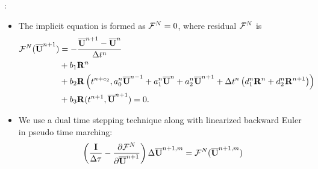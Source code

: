 \documentclass[aspectratio=169,serif]{beamer} %
\begin{document}
\begin{frame}{\secname: \subsecname}
  \begin{itemize}
    \item The implicit equation is formed as $\mathcal{F}^N=0$, where residual $\mathcal{F}^N$ is
          \small
          \begin{equation}
            \begin{aligned}
              \mathcal{F}^N(\overline{\mathbf{U}}^{n+1}) & = -\frac{\overline{\mathbf{U}}^{n+1} - \overline{\mathbf{U}}^{n}}{{\Delta} t^n} \\
                               & +
              b_1 \mathbf{R}^n                                                   \\
                               & +
              b_2 \mathbf{R}\left(t^{n+c_2},a^n_0\overline{\mathbf{U}}^{n - 1} +
              a^n_1\overline{\mathbf{U}}^{n} +
              a^n_2\overline{\mathbf{U}}^{n + 1}
              +
              {\Delta} t^n
              \left(
              d^n_1\mathbf{R}^{n} +
              d^n_2\mathbf{R}^{n + 1}
              \right)\right)                                             \\
                               & +
              b_3 \mathbf{R}(t^{n+1},\overline{\mathbf{U}}^{n+1}) = 0.
              \label{eq:nestedDITR_F}
            \end{aligned}
          \end{equation}
          \normalsize
    \item We use a dual time stepping technique \cite{jameson1991time} along
          with linearized backward Euler in pseudo time marching:
          \small
          \begin{equation}
            \left(\frac{\mathbf{I}}{{\Delta}\tau} -
            \pdv{\mathcal{F}^N}{\overline{\mathbf{U}}^{n+1}}  \right)
            {\Delta}\overline{\mathbf{U}}^{n+1,m} = \mathcal{F}^N(\overline{\mathbf{U}}^{n+1,m})
            \label{eq:abstractNewtonNested}
          \end{equation}
  \end{itemize}
\end{frame}
\end{document}
